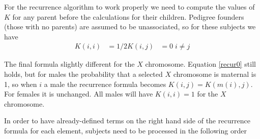 \documentclass{article}
\begin{document}
For the recurrence algorithm to work properly we need to compute the
values of $K$ for any parent before the calculations for their children.
Pedigree founders (those with no parents) are assumed to be unassociated,
so for these subjects we have
\begin{align*}
  K(i,i) &= 1/2
  K(i,j) &=0 \; i\ne j
\end{align*}

The final formula slightly different for the $X$ chromosome. 
Equation \ref{recur0} still holds, but for males the probability
that a selected $X$ chromosome is maternal is 1, so when $i$ a male
the recurrence formula becomes $K(i,j) = K(m(i),j)$.  
For females it is unchanged.
All males will have $K(i,i) = 1$ for the $X$ chromosome.

In order to have already-defined terms on the right hand side of the
recurrence formula for each element, subjects need to be processed
in the following order
\end{document}
